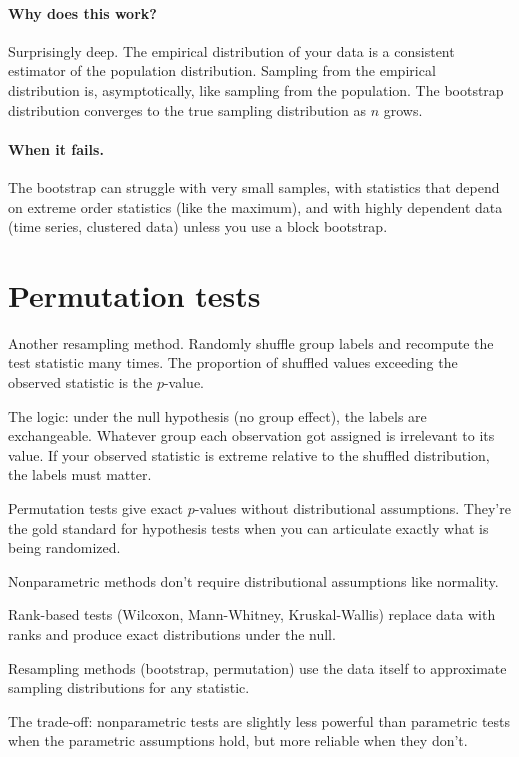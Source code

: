 \paragraph{Why does this work?} Surprisingly deep. The empirical distribution of your data is a consistent estimator of the population distribution. Sampling from the empirical distribution is, asymptotically, like sampling from the population. The bootstrap distribution converges to the true sampling distribution as $n$ grows.

\paragraph{When it fails.} The bootstrap can struggle with very small samples, with statistics that depend on extreme order statistics (like the maximum), and with highly dependent data (time series, clustered data) unless you use a block bootstrap.

\section{Permutation tests}

Another resampling method. Randomly shuffle group labels and recompute the test statistic many times. The proportion of shuffled values exceeding the observed statistic is the $p$-value.

The logic: under the null hypothesis (no group effect), the labels are exchangeable. Whatever group each observation got assigned is irrelevant to its value. If your observed statistic is extreme relative to the shuffled distribution, the labels must matter.

Permutation tests give exact $p$-values without distributional assumptions. They're the gold standard for hypothesis tests when you can articulate exactly what is being randomized.

\begin{keyinsight}
Nonparametric methods don't require distributional assumptions like normality.

Rank-based tests (Wilcoxon, Mann-Whitney, Kruskal-Wallis) replace data with ranks and produce exact distributions under the null.

Resampling methods (bootstrap, permutation) use the data itself to approximate sampling distributions for any statistic.

The trade-off: nonparametric tests are slightly less powerful than parametric tests when the parametric assumptions hold, but more reliable when they don't.
\end{keyinsight}

